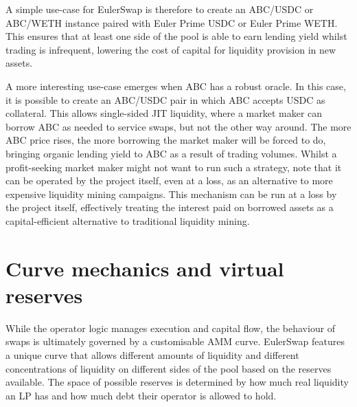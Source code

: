 \documentclass{article}
\begin{document}
A simple use-case for EulerSwap is therefore to create an ABC/USDC or ABC/WETH instance paired with Euler Prime USDC or Euler Prime WETH. This ensures that at least one side of the pool is able to earn lending yield whilst trading is infrequent, lowering the cost of capital for liquidity provision in new assets. 

A more interesting use-case emerges when ABC has a robust oracle. In this case, it is possible to create an ABC/USDC pair in which ABC accepts USDC as collateral. This allows single-sided JIT liquidity, where a market maker can borrow ABC as needed to service swaps, but not the other way around. The more ABC price rises, the more borrowing the market maker will be forced to do, bringing organic lending yield to ABC as a result of trading volumes. Whilst a profit-seeking market maker might not want to run such a strategy, note that it can be operated by the project itself, even at a loss, as an alternative to more expensive liquidity mining campaigns. This mechanism can be run at a loss by the project itself, effectively treating the interest paid on borrowed assets as a capital-efficient alternative to traditional liquidity mining.

\section{Curve mechanics and virtual reserves}

While the operator logic manages execution and capital flow, the behaviour of swaps is ultimately governed by a customisable AMM curve. EulerSwap features a unique curve that allows different amounts of liquidity and different concentrations of liquidity on different sides of the pool based on the reserves available. The space of possible reserves is determined by how much real liquidity an LP has and how much debt their operator is allowed to hold. 
\end{document}
